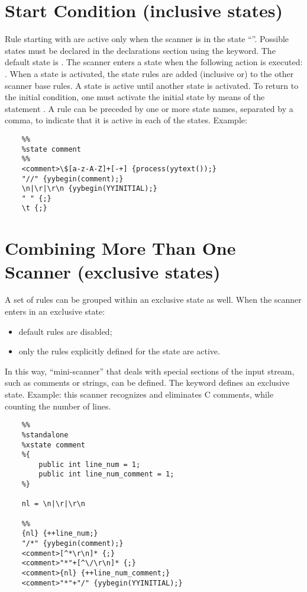 \section{Start Condition (inclusive states)}
Rule starting with  are active only when the scanner is in the state ``''.
Possible states must be declared in the declarations section using the  keyword.
The default state is .
The scanner enters a state when the following action is executed: .
When a state is activated, the state rules are added (inclusive or) to the other scanner base rules.
A state is active until another state is activated.
To return to the initial condition, one must activate the initial state by means of the statement .
A rule can be preceded by one or more state names, separated by a comma, to indicate that it is active in each of the states.
Example:
\begin{lstlisting}
	%%
	%state comment
	%%
	<comment>\$[a-z-A-Z]+[-+] {process(yytext());}
	"//" {yybegin(comment);}
	\n|\r|\r\n {yybegin(YYINITIAL);}
	" " {;}
	\t {;}
\end{lstlisting}

\section{Combining More Than One Scanner (exclusive states)}
A set of rules can be grouped within an exclusive state as well.
When the scanner enters in an exclusive state:
\begin{itemize}
	\item default rules are disabled;
	\item only the rules explicitly defined for the state are active.
\end{itemize}
In this way, ``mini-scanner'' that deals with special sections of the input stream, such as comments or strings, can be defined.
The  keyword defines an exclusive state.
Example: this scanner recognizes and eliminates C comments, while counting the number of lines.
\begin{lstlisting}
	%%
	%standalone
	%xstate comment
	%{
		public int line_num = 1;
		public int line_num_comment = 1;
	%}

	nl = \n|\r|\r\n

	%%
	{nl} {++line_num;}
	"/*" {yybegin(comment);}
	<comment>[^*\r\n]* {;}
	<comment>"*"+[^\/\r\n]* {;}
	<comment>{nl} {++line_num_comment;}
	<comment>"*"+"/" {yybegin(YYINITIAL);}
\end{lstlisting}

